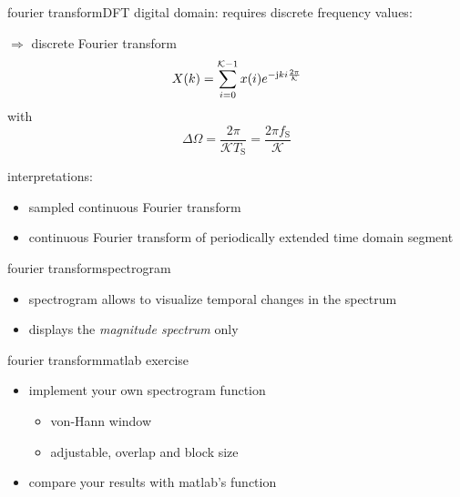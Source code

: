         \begin{frame}{fourier transform}{DFT}
            digital domain: requires discrete frequency values:
            
            $\Rightarrow$ discrete Fourier transform
            \begin{equation*}\label{eq:dft}
                X(k) = \sum\limits_{i=0}^{\mathcal{K}-1}{x(i){e}^{-\mathrm{j}ki\frac{2\pi}{\mathcal{K}}}}
            \end{equation*}
            with
            \begin{equation*}
                \Delta\Omega = \frac{2\pi}{\mathcal{K}T_{\mathrm{S}}} = \frac{2\pi f_{\mathrm{S}}}{\mathcal{K}}
            \end{equation*}
            
             interpretations:
            \begin{itemize}
                \item	sampled continuous Fourier transform
                \item	continuous Fourier transform of periodically extended time domain segment
            \end{itemize}
        \end{frame}	

        \begin{frame}{fourier transform}{spectrogram}
            \vspace{-1mm}
            \begin{itemize}
                \item   spectrogram allows to visualize temporal changes in the spectrum
                \item   displays the \textit{magnitude spectrum }only
            \end{itemize}
            \vspace{-3mm}
            
        \end{frame}	
        
        \begin{frame}{fourier transform}{matlab exercise}
            
            \begin{itemize}
                \item   implement your own spectrogram function
                    \begin{itemize}
                        \item   von-Hann window
                        \item   adjustable, overlap and block size
                    \end{itemize}
                \item   compare your results with matlab's function
            \end{itemize}
        \end{frame}
        
